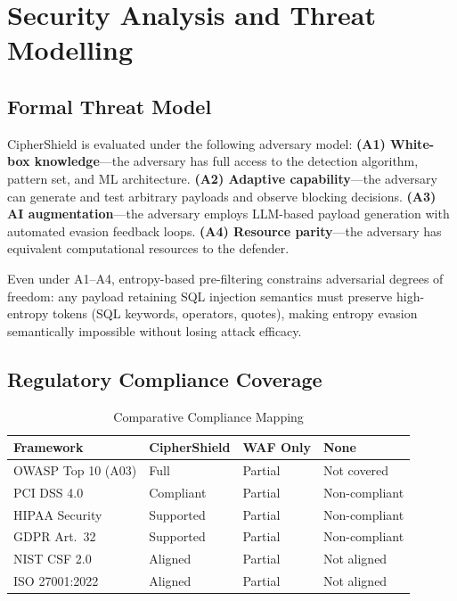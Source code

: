 \documentclass[10pt,twocolumn]{article}
\begin{document}
\section{Security Analysis and Threat Modelling}
\label{sec:security}

\subsection{Formal Threat Model}

CipherShield is evaluated under the following adversary model:
\textbf{(A1) White-box knowledge}---the adversary has full access to
the detection algorithm, pattern set, and ML architecture.
\textbf{(A2) Adaptive capability}---the adversary can generate and test
arbitrary payloads and observe blocking decisions.
\textbf{(A3) AI augmentation}---the adversary employs LLM-based payload
generation with automated evasion feedback loops.
\textbf{(A4) Resource parity}---the adversary has equivalent computational
resources to the defender.

Even under A1--A4, entropy-based pre-filtering constrains adversarial
degrees of freedom: any payload retaining SQL injection semantics must
preserve high-entropy tokens (SQL keywords, operators, quotes), making
entropy evasion semantically impossible without losing attack efficacy.

\subsection{Regulatory Compliance Coverage}

\begin{table}[H]
\centering
\caption{Comparative Compliance Mapping}
\label{tab:compliance}
\small
\setlength{\tabcolsep}{3pt}
\begin{tabular}{@{}lp{1.6cm}p{1.4cm}p{1.4cm}@{}}
\toprule
\textbf{Framework} & \textbf{CipherShield} & \textbf{WAF Only} & \textbf{None} \\
\midrule
OWASP Top 10 (A03) & Full       & Partial & Not covered   \\
PCI DSS 4.0        & Compliant  & Partial & Non-compliant \\
HIPAA Security     & Supported  & Partial & Non-compliant \\
GDPR Art.\ 32      & Supported  & Partial & Non-compliant \\
NIST CSF 2.0       & Aligned    & Partial & Not aligned   \\
ISO 27001:2022     & Aligned    & Partial & Not aligned   \\
\bottomrule
\end{tabular}
\end{table}
\end{document}
